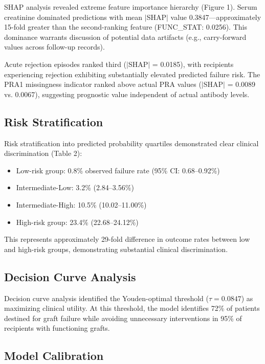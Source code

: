 \documentclass[11pt,a4paper]{article}
\begin{document}
SHAP analysis revealed extreme feature importance hierarchy (Figure 1). Serum creatinine dominated predictions with mean $|$SHAP$|$ value 0.3847—approximately 15-fold greater than the second-ranking feature (FUNC\_STAT: 0.0256). This dominance warrants discussion of potential data artifacts (e.g., carry-forward values across follow-up records).

Acute rejection episodes ranked third ($|$SHAP$|$ = 0.0185), with recipients experiencing rejection exhibiting substantially elevated predicted failure risk. The PRA1 missingness indicator ranked above actual PRA values ($|$SHAP$|$ = 0.0089 vs. 0.0067), suggesting prognostic value independent of actual antibody levels.

\subsection{Risk Stratification}

Risk stratification into predicted probability quartiles demonstrated clear clinical discrimination (Table 2):
\begin{itemize}
    \item Low-risk group: 0.8\% observed failure rate (95\% CI: 0.68–0.92\%)
    \item Intermediate-Low: 3.2\% (2.84–3.56\%)
    \item Intermediate-High: 10.5\% (10.02–11.00\%)
    \item High-risk group: 23.4\% (22.68–24.12\%)
\end{itemize}

This represents approximately 29-fold difference in outcome rates between low and high-risk groups, demonstrating substantial clinical discrimination.

\subsection{Decision Curve Analysis}

Decision curve analysis identified the Youden-optimal threshold ($\tau=0.0847$) as maximizing clinical utility. At this threshold, the model identifies 72\% of patients destined for graft failure while avoiding unnecessary interventions in 95\% of recipients with functioning grafts.

\subsection{Model Calibration}
\end{document}
